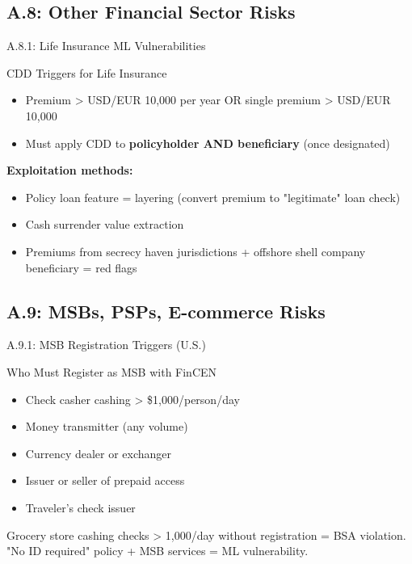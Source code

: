 \documentclass{beamer}
\begin{document}
	\subsection{A.8: Other Financial Sector Risks}
	
	\begin{frame}{A.8.1: Life Insurance ML Vulnerabilities}
		\begin{block}{CDD Triggers for Life Insurance}
			\begin{itemize}
				\item Premium > USD/EUR 10,000 per year OR single premium > USD/EUR 10,000
				\item Must apply CDD to \textbf{policyholder AND beneficiary} (once designated)
			\end{itemize}
		\end{block}
		\textbf{Exploitation methods:}
		\begin{itemize}
			\item Policy loan feature = layering (convert premium to "legitimate" loan check)
			\item Cash surrender value extraction
			\item Premiums from secrecy haven jurisdictions + offshore shell company beneficiary = red flags
		\end{itemize}
	\end{frame}
	
	\subsection{A.9: MSBs, PSPs, E-commerce Risks}
	
	\begin{frame}{A.9.1: MSB Registration Triggers (U.S.)}
		\begin{block}{Who Must Register as MSB with FinCEN}
			\begin{itemize}
				\item Check casher cashing > \$1,000/person/day
				\item Money transmitter (any volume)
				\item Currency dealer or exchanger
				\item Issuer or seller of prepaid access
				\item Traveler's check issuer
			\end{itemize}
		\end{block}
		\textcolor{red}{\textbf{}} Grocery store cashing checks > 1,000/day without registration = BSA violation. "No ID required" policy + MSB services = ML vulnerability.
	\end{frame}
	
\end{document}
